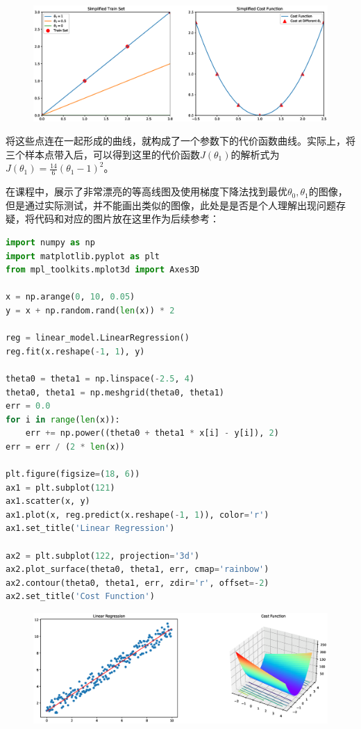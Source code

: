 \documentclass[12pt, a4paper]{article}
\begin{document}
            \begin{figure}[H]
                \includegraphics[width=1\textwidth]{OneParameterCostFunction.eps}
            \end{figure}

            将这些点连在一起形成的曲线，就构成了一个参数下的代价函数曲线。实际上，将三个样本点带入后，可以得到这里的代价函数$J(\theta_1)$的解析式为$J(\theta_1)=\frac{14}{6}(\theta_1-1)^2$。

           在课程中，展示了非常漂亮的等高线图及使用梯度下降法找到最优$\theta_0, \theta_1$的图像，但是通过实际测试，并不能画出类似的图像，此处是是否是个人理解出现问题存疑，将代码和对应的图片放在这里作为后续参考：

           \begin{lstlisting}[language=Python]
import numpy as np
import matplotlib.pyplot as plt
from mpl_toolkits.mplot3d import Axes3D

x = np.arange(0, 10, 0.05)
y = x + np.random.rand(len(x)) * 2

reg = linear_model.LinearRegression()
reg.fit(x.reshape(-1, 1), y)

theta0 = theta1 = np.linspace(-2.5, 4)
theta0, theta1 = np.meshgrid(theta0, theta1)
err = 0.0
for i in range(len(x)):
    err += np.power((theta0 + theta1 * x[i] - y[i]), 2)
err = err / (2 * len(x))

plt.figure(figsize=(18, 6))
ax1 = plt.subplot(121)
ax1.scatter(x, y)
ax1.plot(x, reg.predict(x.reshape(-1, 1)), color='r')
ax1.set_title('Linear Regression')

ax2 = plt.subplot(122, projection='3d')
ax2.plot_surface(theta0, theta1, err, cmap='rainbow')
ax2.contour(theta0, theta1, err, zdir='r', offset=-2)
ax2.set_title('Cost Function')
           \end{lstlisting}

           \begin{figure}[H]
               \includegraphics[width=1\textwidth]{CostFunction.eps}
           \end{figure}
\end{document}
